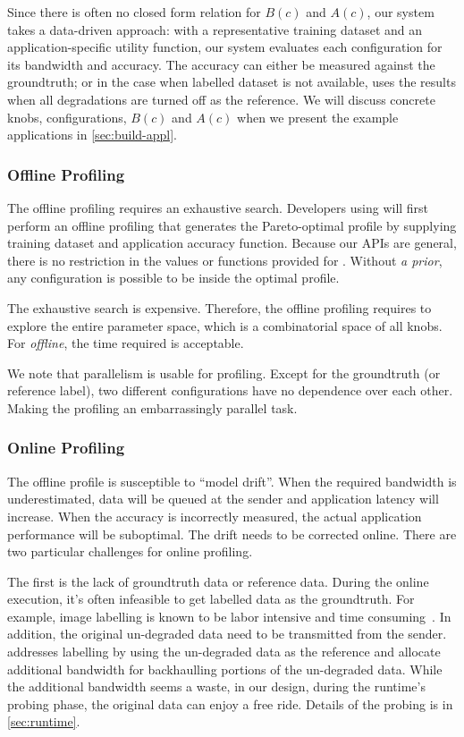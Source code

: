 Since there is often no closed form relation for $B(c)$ and $A(c)$, our system
takes a data-driven approach: with a representative training dataset and an
application-specific utility function, our system evaluates each configuration
for its bandwidth and accuracy. The accuracy can either be measured against the
groundtruth; or in the case when labelled dataset is not available, \sysname{}
uses the results when all degradations are turned off as the reference. We will
discuss concrete knobs, configurations, $B(c)$ and $A(c)$ when we present the
example applications in \autoref{sec:build-appl}.

\subsubsection{Offline Profiling}
\label{sec:offline-profiling}

The offline profiling requires an exhaustive search. Developers using \sysname{}
will first perform an offline profiling that generates the Pareto-optimal
profile by supplying training dataset and application accuracy function. Because
our APIs are general, there is no restriction in the values or functions
provided for \maybe{}. Without \textit{a prior}, any configuration is possible
to be inside the optimal profile.

The exhaustive search is expensive. Therefore, the offline profiling requires to
explore the entire parameter space, which is a combinatorial space of all
knobs. For \textit{offline}, the time required is acceptable.

We note that parallelism is usable for profiling. Except for the groundtruth (or
reference label), two different configurations have no dependence over each
other. Making the profiling an embarrassingly parallel task.

\subsubsection{Online Profiling}
\label{sec:online-profiling}

The offline profile is susceptible to ``model drift''. When the required
bandwidth is underestimated, data will be queued at the sender and application
latency will increase. When the accuracy is incorrectly measured, the actual
application performance will be suboptimal. The drift needs to be corrected
online. There are two particular challenges for online profiling.

The first is the lack of groundtruth data or reference data. During the online
execution, it's often infeasible to get labelled data as the groundtruth. For
example, image labelling is known to be labor intensive and time
consuming~\cite{russell2008labelme}. In addition, the original un-degraded data
need to be transmitted from the sender. \sysname{} addresses labelling by using
the un-degraded data as the reference and allocate additional bandwidth for
backhaulling portions of the un-degraded data. While the additional bandwidth
seems a waste, in our design, during the runtime's probing phase, the original
data can enjoy a free ride. Details of the probing is in \autoref{sec:runtime}.

